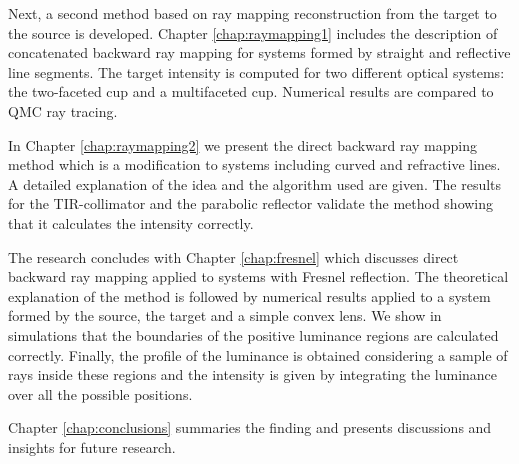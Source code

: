 Next, a second method based on ray mapping reconstruction from the target to the source is developed. Chapter \ref{chap:raymapping1} includes the description of concatenated backward ray mapping for systems formed by straight and reflective line segments. The target intensity is computed for two different optical systems: the two-faceted cup and a multifaceted cup. Numerical results are compared to QMC ray tracing. 

In Chapter \ref{chap:raymapping2} we present the direct backward ray mapping method which is a modification to systems including curved and refractive lines. A detailed explanation of the idea and the algorithm used are given. The results for the TIR-collimator and the parabolic reflector validate the method showing that it calculates the intensity correctly. 

The research concludes with Chapter \ref{chap:fresnel} which discusses direct backward ray mapping applied to systems with Fresnel reflection. The theoretical explanation of the method is followed by numerical results applied to a system formed by the source, the target and a simple convex lens. We show in simulations that the boundaries of the positive luminance regions are calculated correctly. Finally, the profile of the luminance is obtained considering a sample of rays inside these regions and the intensity is given by integrating the luminance over all the possible positions. 

Chapter \ref{chap:conclusions} summaries the finding and presents discussions and insights for future research.
\clearpage{\pagestyle{empty}\cleardoublepage}
 